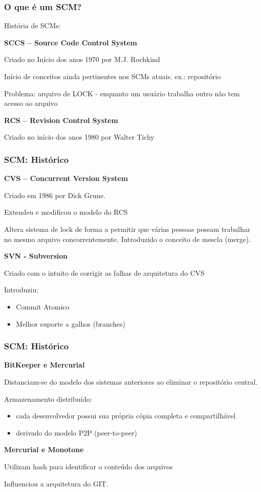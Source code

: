 \documentclass{beamer}
\begin{document}
\begin{frame}
\frametitle{O que é um SCM?}

História de SCMs:

\textbf{SCCS – Source Code Control System}

Criado no Início dos anos 1970 por M.J. Rochkind

Início de conceitos ainda pertinentes nos SCMs atuais. ex.: repositório

Problema: arquivo de LOCK - enquanto um usuário trabalha outro não tem acesso ao arquivo

\textbf{RCS – Revision Control System}

Criado no início dos anos 1980 por Walter Tichy

\end{frame}
\begin{frame}
\frametitle{SCM: Histórico}

\textbf{CVS – Concurrent Version System}

Criado em 1986 por Dick Grune.

Extendeu e modificou o modelo do RCS

Altera sistema de lock de forma a permitir que várias pessoas possam trabalhar no mesmo arquivo concorrentemente. Introduzido o conceito de mescla (merge).

\textbf{SVN - Subversion }

Criado com o intuito de corrigir as falhas de arquitetura do CVS

Introduziu:
\begin{itemize}
\item Commit Atomico
\item Melhor suporte a galhos (branches)
\end{itemize}


\end{frame}

\begin{frame}
\frametitle{SCM: Histórico}

\textbf{BitKeeper e Mercurial}

Distanciam-se do modelo dos sistemas anteriores ao eliminar o repositório central. 

Armazenamento distribuído:

\begin{itemize}
\item cada desenvolvedor possui sua própria cópia completa e compartilhável
\item derivado do modelo P2P (peer-to-peer)
\end{itemize}

\textbf{Mercurial e Monotone}

Utilizam hash para identificar o conteúdo dos arquivos 

Influenciou a arquitetura do GIT.
\end{frame}
\end{document}
